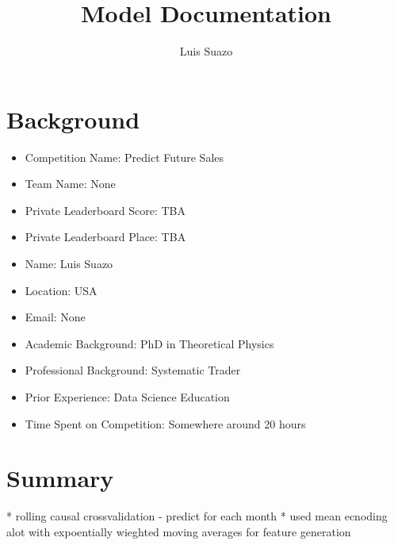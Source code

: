 \documentclass[a4paper]{article}
\title{Model Documentation}
\author{Luis Suazo}
\date{}
\begin{document}
\maketitle

\section{Background}	
\begin{itemize}
  \item Competition Name: Predict Future Sales
  \item Team Name: None
  \item Private Leaderboard Score: TBA
  \item Private Leaderboard Place: TBA
  \item Name: Luis Suazo
  \item Location: USA
  \item Email: None
  \item Academic Background: PhD in Theoretical Physics
  \item Professional Background: Systematic Trader
  \item Prior Experience: Data Science Education
  \item Time Spent on Competition: Somewhere around 20 hours
\end{itemize}	

\section{Summary}
* rolling causal crossvalidation - predict for each month	
* used mean ecnoding alot with expoentially wieghted moving averages for feature generation
\end{document}
